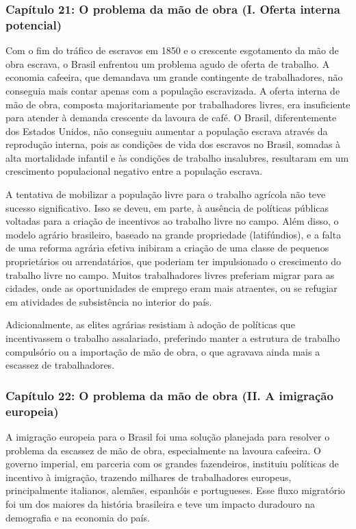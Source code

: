 \documentclass[a4paper,12pt]{article}[abntex2]
\begin{document}
\subsubsection{\textbf{Capítulo 21: O problema da mão de obra (I. Oferta interna potencial)}}

Com o fim do tráfico de escravos em 1850 e o crescente esgotamento da mão de obra escrava, o Brasil enfrentou um problema agudo de oferta de trabalho. A economia cafeeira, que demandava um grande contingente de trabalhadores, não conseguia mais contar apenas com a população escravizada. A oferta interna de mão de obra, composta majoritariamente por trabalhadores livres, era insuficiente para atender à demanda crescente da lavoura de café. O Brasil, diferentemente dos Estados Unidos, não conseguiu aumentar a população escrava através da reprodução interna, pois as condições de vida dos escravos no Brasil, somadas à alta mortalidade infantil e às condições de trabalho insalubres, resultaram em um crescimento populacional negativo entre a população escrava.

A tentativa de mobilizar a população livre para o trabalho agrícola não teve sucesso significativo. Isso se deveu, em parte, à ausência de políticas públicas voltadas para a criação de incentivos ao trabalho livre no campo. Além disso, o modelo agrário brasileiro, baseado na grande propriedade (latifúndios), e a falta de uma reforma agrária efetiva inibiram a criação de uma classe de pequenos proprietários ou arrendatários, que poderiam ter impulsionado o crescimento do trabalho livre no campo. Muitos trabalhadores livres preferiam migrar para as cidades, onde as oportunidades de emprego eram mais atraentes, ou se refugiar em atividades de subsistência no interior do país.

Adicionalmente, as elites agrárias resistiam à adoção de políticas que incentivassem o trabalho assalariado, preferindo manter a estrutura de trabalho compulsório ou a importação de mão de obra, o que agravava ainda mais a escassez de trabalhadores.

\subsubsection{\textbf{Capítulo 22: O problema da mão de obra (II. A imigração europeia)}}

A imigração europeia para o Brasil foi uma solução planejada para resolver o problema da escassez de mão de obra, especialmente na lavoura cafeeira. O governo imperial, em parceria com os grandes fazendeiros, instituiu políticas de incentivo à imigração, trazendo milhares de trabalhadores europeus, principalmente italianos, alemães, espanhóis e portugueses. Esse fluxo migratório foi um dos maiores da história brasileira e teve um impacto duradouro na demografia e na economia do país.
\end{document}
